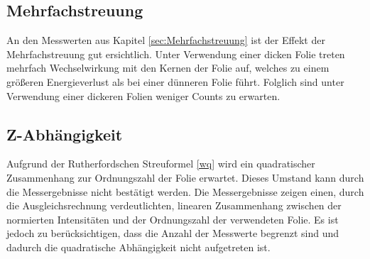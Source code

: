 \subsection{Mehrfachstreuung}
An den Messwerten aus Kapitel \ref{sec:Mehrfachstreuung} ist der Effekt der Mehrfachstreuung gut ersichtlich. Unter Verwendung einer dicken Folie treten mehrfach Wechselwirkung mit den Kernen der Folie auf, welches zu einem größeren Energieverlust als bei einer dünneren Folie führt. Folglich sind unter Verwendung einer dickeren Folien weniger Counts zu erwarten.

\subsection{Z-Abhängigkeit}
Aufgrund der Rutherfordschen Streuformel \ref{wq} wird ein quadratischer Zusammenhang zur Ordnungszahl der Folie erwartet. Dieses Umstand kann durch die Messergebnisse nicht bestätigt werden. Die Messergebnisse zeigen einen, durch die Ausgleichsrechnung verdeutlichten, linearen Zusammenhang zwischen der normierten Intensitäten und der Ordnungszahl der verwendeten Folie. Es ist jedoch zu berücksichtigen, dass die Anzahl der Messwerte begrenzt sind und dadurch die quadratische Abhängigkeit nicht aufgetreten ist.



